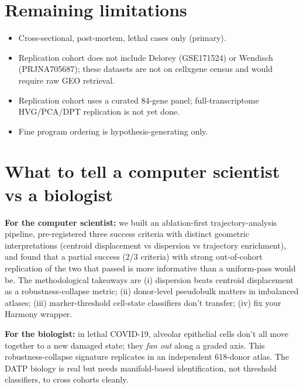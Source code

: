 \documentclass[11pt]{article}
\begin{document}
\section{Remaining limitations}

\begin{itemize}
\item Cross-sectional, post-mortem, lethal cases only (primary).
\item Replication cohort does not include Delorey (GSE171524) or Wendisch
      (PRJNA705687); these datasets are not on cellxgene census and would require
      raw GEO retrieval.
\item Replication cohort uses a curated 84-gene panel; full-transcriptome HVG/PCA/DPT
      replication is not yet done.
\item Fine program ordering is hypothesis-generating only.
\end{itemize}

\section{What to tell a computer scientist vs a biologist}

\textbf{For the computer scientist:} we built an ablation-first trajectory-analysis
pipeline, pre-registered three success criteria with distinct geometric
interpretations (centroid displacement vs dispersion vs trajectory enrichment),
and found that a partial success (2/3 criteria) with strong out-of-cohort replication
of the two that passed is more informative than a uniform-pass would be. The
methodological takeaways are (i) dispersion beats centroid displacement as a
robustness-collapse metric; (ii) donor-level pseudobulk matters in imbalanced atlases;
(iii) marker-threshold cell-state classifiers don't transfer; (iv) fix your Harmony
wrapper.

\textbf{For the biologist:} in lethal COVID-19, alveolar epithelial cells don't all
move together to a new damaged state; they \emph{fan out} along a graded axis.
This robustness-collapse signature replicates in an independent 618-donor atlas.
The DATP biology is real but needs manifold-based identification, not threshold
classifiers, to cross cohorts cleanly.
\end{document}
